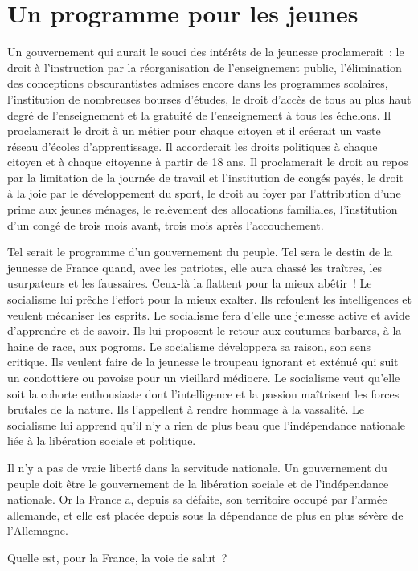 \documentclass[french,twoside]{book} %
\newcommand\chapterclose{} %
\begin{document}
\section[Un programme pour les jeunes]{Un programme pour les jeunes}
\noindent Un gouvernement qui aurait le souci des intérêts de la jeunesse proclamerait : le droit à l’instruction par la réorganisation de l’enseignement public, l’élimination des conceptions obscurantistes admises encore dans les programmes scolaires, l’institution de nombreuses bourses d’études, le droit d’accès de tous au plus haut degré de l’enseignement et la gratuité de l’enseignement à tous les échelons. Il proclamerait le droit à un métier pour chaque citoyen et il créerait un vaste réseau d’écoles d’apprentissage. Il accorderait les droits politiques à chaque citoyen et à chaque citoyenne à partir de 18 ans. Il proclamerait le droit au repos par la limitation de la journée de travail et l’institution de congés payés, le droit à la joie par le développement du sport, le droit au foyer par l’attribution d’une prime aux jeunes ménages, le relèvement des allocations familiales, l’institution d’un congé de trois mois avant, trois mois après l’accouchement.\par
Tel serait le programme d’un gouvernement du peuple. Tel sera le destin de la jeunesse de France quand, avec les patriotes, elle aura chassé les traîtres, les usurpateurs et les faussaires. Ceux-là la flattent pour la mieux abêtir ! Le socialisme lui prêche l’effort pour la mieux exalter. Ils refoulent les intelligences et veulent mécaniser les esprits. Le socialisme fera d’elle une jeunesse active et avide d’apprendre et de savoir. Ils lui proposent le retour aux coutumes barbares, à la haine de race, aux pogroms. Le socialisme développera sa raison, son sens critique. Ils veulent faire de la jeunesse le troupeau ignorant et exténué qui suit un condottiere ou pavoise pour un vieillard médiocre. Le socialisme veut qu’elle soit la cohorte enthousiaste dont l’intelligence et la passion maîtrisent les forces brutales de la nature. Ils l’appellent à rendre hommage à la vassalité. Le socialisme lui apprend qu’il n’y a rien de plus beau que l’indépendance nationale liée à la libération sociale et politique.\par
Il n’y a pas de vraie liberté dans la servitude nationale. Un gouvernement du peuple doit être le gouvernement de la libération sociale et de l’indépendance nationale. Or la France a, depuis sa défaite, son territoire occupé par l’armée allemande, et elle est placée depuis sous la dépendance de plus en plus sévère de l’Allemagne.\par
Quelle est, pour la France, la voie de salut ?
\chapterclose
\end{document}
